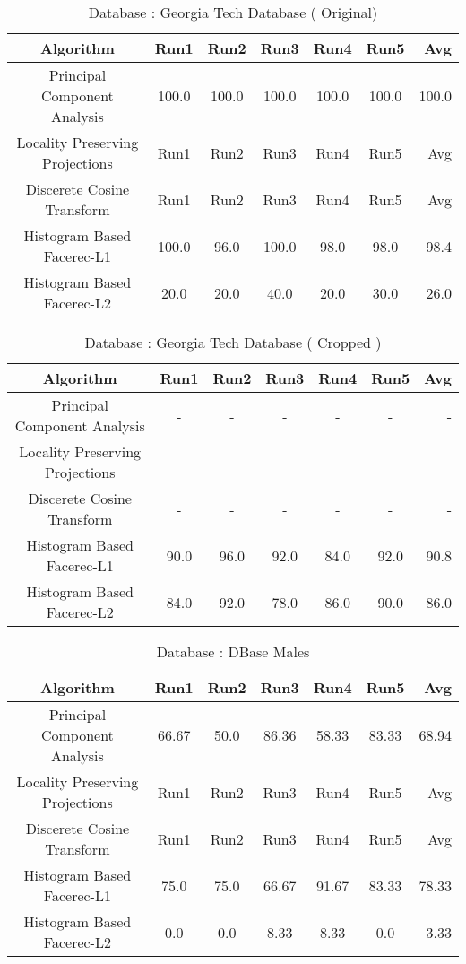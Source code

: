 \documentclass[10pt,a4paper]{article}
\begin{document}
\begin{center}
\begin{table}
\begin{tabular}{| c | c | c | c | c | c | r | }
\end{tabular}
\end{table}

\begin{table}
\caption{Database : Georgia Tech Database ( Original) }
\centering
\begin{tabular}{| c | c | c | c | c | c | r | } \hline 
Algorithm & Run1 & Run2 & Run3 & Run4 & Run5 & Avg  \\  
\hline
Principal Component Analysis & 100.0 & 100.0 & 100.0 & 100.0 & 100.0 & 100.0 \\
\hline
Locality Preserving Projections & Run1 & Run2 & Run3 & Run4 & Run5 & Avg \\
\hline
Discerete Cosine Transform & Run1 & Run2 & Run3 & Run4 & Run5 & Avg \\
\hline
Histogram Based Facerec-L1 & 100.0 & 96.0 & 100.0 & 98.0 & 98.0 & 98.4 \\
\hline
Histogram Based Facerec-L2 & 20.0 & 20.0 & 40.0 & 20.0 & 30.0 & 26.0 \\
\hline

\end{tabular}
\end{table}

\begin{table}
\caption{Database : Georgia Tech Database ( Cropped ) }
\centering
\begin{tabular}{| c | c | c | c | c | c | r | } \hline 
Algorithm & Run1 & Run2 & Run3 & Run4 & Run5 & Avg  \\  
\hline
Principal Component Analysis & - & - & - & - & - & - \\
\hline
Locality Preserving Projections & - & - & - & - & - & - \\
\hline
Discerete Cosine Transform & - & - & - & - & - & - \\
\hline
Histogram Based Facerec-L1 & 90.0 & 96.0 & 92.0 & 84.0 & 92.0 & 90.8 \\
\hline
Histogram Based Facerec-L2 & 84.0 & 92.0 & 78.0 & 86.0 & 90.0 & 86.0 \\
\hline

\end{tabular}
\end{table}

\begin{table}
\caption{Database : DBase Males }
\centering
\begin{tabular}{| c | c | c | c | c | c | r | } \hline 
Algorithm & Run1 & Run2 & Run3 & Run4 & Run5 & Avg  \\  
\hline
Principal Component Analysis & 66.67 & 50.0 & 86.36 & 58.33 & 83.33 & 68.94 \\
\hline
Locality Preserving Projections & Run1 & Run2 & Run3 & Run4 & Run5 & Avg \\
\hline
Discerete Cosine Transform & Run1 & Run2 & Run3 & Run4 & Run5 & Avg \\
\hline
Histogram Based Facerec-L1 & 75.0 & 75.0 & 66.67 & 91.67 & 83.33 & 78.33 \\
\hline
Histogram Based Facerec-L2 & 0.0 & 0.0 & 8.33 & 8.33 & 0.0 & 3.33 \\
\hline


\end{tabular}
\end{table}
\end{center}
\end{document}
